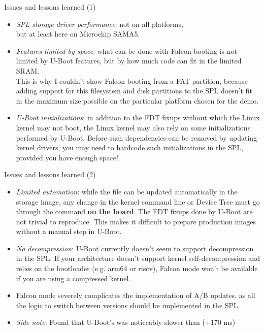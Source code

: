 \begin{frame}{Issues and lessons learned (1)}
   \begin{itemize}
      \item {\em SPL storage driver performance}: not on all platforms,\\
	    but at least here on Microchip SAMA5.
      \item {\em Features limited by space}: what can be done with
            Falcon booting is not limited by U-Boot features, but by how much code
	    can fit in the limited SRAM.\\
	    This is why I couldn't show Falcon booting from a FAT
            partition, because adding support for this filesystem and disk partitions to
	    the SPL doesn't fit in the maximum size possible on the particular
	    platform chosen for the demo.
      \item {\em U-Boot initializations}: in addition to the FDT fixups without which
            the Linux kernel may not boot, the Linux kernel may also rely on some
            initializations performed by U-Boot. Before such dependencies
	    can be removed by updating kernel drivers, you may need to
	    hardcode such initializations in the SPL, provided you have enough
	    space!
   \end{itemize}
\end{frame}

\begin{frame}{Issues and lessons learned (2)}
   \begin{itemize}
      \item {\em Limited automation}: while the  file can be updated
            automatically in the storage image, any change in the kernel
	    command line or Device Tree must go through the  command
            {\bf on the board}. The FDT fixups done by U-Boot are not trivial to
            reproduce. This makes it difficult to prepare production images without a
            manual step in U-Boot.
      \item {\em No decompression}: U-Boot currently doesn't seem to
	    support decompression in the SPL. If your architecture
            doesn't support kernel self-decompression and relies on the bootloader
	    (e.g. arm64 or riscv), Falcon mode won't be available if you are using
	    a compressed kernel.
      \item Falcon mode severely complicates the implementation of A/B updates,
	    as all the logic to switch between versions should be implemented
	    in the SPL.
      \item {\em Side note}: Found that U-Boot's  was
	    noticeably slower than  (+170 ms)
   \end{itemize}
\end{frame}

